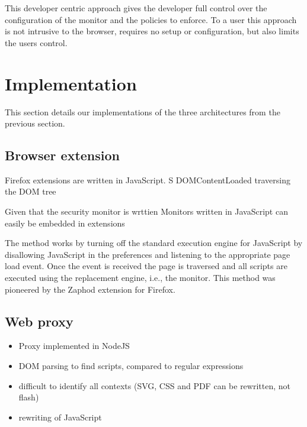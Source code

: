 \documentclass{llncs}
\newcommand{\todo}[1]{\colorbox{red}{\textcolor{white}{\sffamily\bfseries\scriptsize TODO}} \textcolor{red}{#1} \textcolor{red}{$\blacktriangleleft$}}
\begin{document}
This developer centric approach gives the developer full control over the 
configuration of the monitor and the policies to enforce. To a user this 
approach is not intrusive to the browser, requires no setup or configuration, 
but also limits the users control. 


\section{Implementation}
\label{sec:impl}

This section details our implementations of the three architectures
from the previous section. 


\subsection{Browser extension}

Firefox extensions are written in JavaScript. S
DOMContentLoaded 
traversing the DOM tree 


Given that
the security monitor is wrttien
Monitors written in JavaScript can easily be embedded in extensions


The method works by turning off the standard execution engine for JavaScript
by disallowing JavaScript in the preferences and listening to the appropriate
page load event. Once the event is received the page is traversed and all
scripts are executed using the replacement engine, i.e., the monitor. This
method was pioneered by the Zaphod \cite{Zaphod} extension for Firefox.



\subsection{Web proxy}

\begin{itemize}
\item Proxy implemented in NodeJS
\item DOM parsing to find scripts, compared to regular expressions
\item difficult to identify all contexts (SVG, CSS and PDF can be rewritten, not flash)
\item rewriting of JavaScript
\end{itemize}
\end{document}

